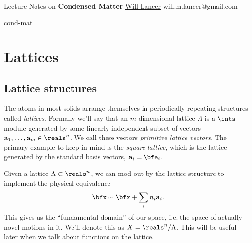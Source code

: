 \documentclass[11pt]{article}
\begin{document}
\thispagestyle{empty}
\bigskip \
\vspace{0.1cm}

\begin{center}
{\fontsize{22}{22} \selectfont Lecture Notes on}
\vskip 16pt
{\fontsize{36}{36} \selectfont \bf \sffamily Condensed Matter}
\vskip 24pt
{\fontsize{18}{18} \selectfont \rmfamily \href{https://will-lancer.github.io}{Will Lancer}}
\vskip 6pt
{\fontsize{14}{14} \selectfont \ttfamily will.m.lancer@gmail.com}
\vskip 24pt
\end{center}

{\parindent0pt \baselineskip=15.5pt}
\noin
cond-mat

\newpage
\microtoc
\newpage

\section{Lattices}

\subsection{Lattice structures}

The atoms in most solids arrange themselves in periodically repeating
structures called \emph{lattices}. Formally we'll say that an $m$-dimensional lattice
$\Lambda$ is a $\ints$-module generated by some linearly independent subset of vectors 
$\mathbf{a}_1, \ldots, \mathbf{a}_m \in \reals^n$. We call these vectors \emph{primitive
lattice vectors}. The primary example to keep in mind is the \emph{square lattice},
which is the lattice generated by the standard basis vectors, $\mathbf{a}_i = \bfe_i$.

Given a lattice $\Lambda \subset \reals^n$, we can mod out by the lattice structure to implement 
the physical equivalence
\begin{align*}
    \bfx \sim \bfx + \sum_i n_i \mathbf{a}_i.
\end{align*}
This gives us the ``fundamental domain'' of our space, i.e. the space of actually
novel motions in it. We'll denote this as $X = \reals^n/\Lambda$. This will be useful
later when we talk about functions on the lattice.
\end{document}

